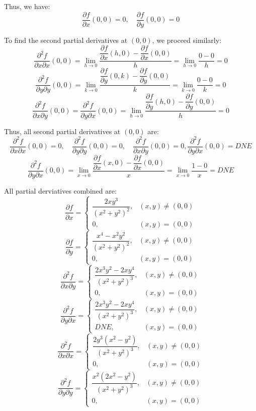 \documentclass[a4paper,12pt,openany]{book}
\newcommand{\pd}[2]{\dfrac{\partial #1}{\partial #2}}
\newcommand{\pdm}[3]{\dfrac{\partial^2 #1}{\partial #2 \partial #3}}
\begin{document}
Thus, we have:
\[
    \pd{f}{x}(0, 0) = 0, \quad \pd{f}{y}(0, 0) = 0
\]

To find the second partial derivatives at \( (0, 0) \), we proceed similarly:
\[
    \pdm{f}{x}{x}(0, 0) = \lim_{h \to 0} \dfrac{\pd{f}{x}(h, 0) - \pd{f}{x}(0, 0)}{h} = \lim_{h \to 0} \dfrac{0 - 0}{h} = 0
\]
\[
    \pdm{f}{y}{y}(0, 0) = \lim_{k \to 0} \dfrac{\pd{f}{y}(0, k) - \pd{f}{y}(0, 0)}{k} = \lim_{k \to 0} \dfrac{0 - 0}{k} = 0
\]
\[
    \pdm{f}{x}{y}(0, 0) = \pdm{f}{y}{x}(0, 0) = \lim_{h \to 0} \dfrac{\pd{f}{y}(h, 0) - \pd{f}{y}(0, 0)}{h} = 0
\]

Thus, all second partial derivatives at \( (0, 0) \) are:
\[
    \pdm{f}{x}{x}(0, 0) = 0, \quad \pdm{f}{y}{y}(0, 0) = 0, \quad \pdm{f}{x}{y}(0, 0) = 0, \pdm{f}{y}{x}(0, 0) = DNE
\]
\[
    \pdm{f}{y}{x}(0, 0) = 
    \lim_{x\to 0} \dfrac{\pd{f}{x}(x, 0) - \pd{f}{x}(0, 0)}{x} = \lim_{x\to 0} \dfrac{1 - 0}{x} = DNE
\]

All partial derviatives combined are:
\[
    \pd{f}{x} = 
    \begin{cases}
        \dfrac{2xy^3}{(x^2 + y^2)^2}, & (x, y) \neq (0, 0)\\
        0, & (x, y) = (0, 0)
    \end{cases}
\]
\[
    \pd{f}{y} = 
    \begin{cases}
        \dfrac{x^4 - x^2 y^2}{(x^2 + y^2)^2}, & (x, y) \neq (0, 0)\\
        0, & (x, y) = (0, 0)
    \end{cases}
\]
\[
    \pdm{f}{x}{y} = 
    \begin{cases}
        \dfrac{2x^3 y^2 - 2x y^4}{(x^2 + y^2)^3}, & (x, y) \neq (0, 0)\\
        0, & (x, y) = (0, 0)
    \end{cases}
\]
\[
    \pdm{f}{y}{x} = 
    \begin{cases}
        \dfrac{2x^3 y^2 - 2x y^4}{(x^2 + y^2)^3}, & (x, y) \neq (0, 0)\\
        DNE, & (x, y) = (0, 0)
    \end{cases}
\]
\[
    \pdm{f}{x}{x} = 
    \begin{cases}
        \dfrac{2y^3(x^2 - y^2)}{(x^2 + y^2)^3}, & (x, y) \neq (0, 0)\\
        0, & (x, y) = (0, 0)
    \end{cases}
\]
\[
    \pdm{f}{y}{y} = 
    \begin{cases}
        \dfrac{x^2(2x^2 - y^2)}{(x^2 + y^2)^3}, & (x, y) \neq (0, 0)\\
        0, & (x, y) = (0, 0)
    \end{cases}
\]
\end{document}
